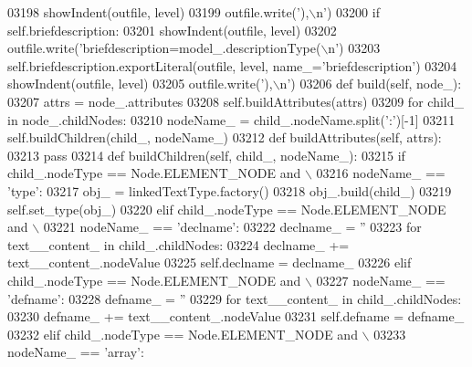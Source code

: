 \begin{DoxyCode}
{{{{{{{{{{{{{{{{{{{{{{{{{{{{{{{{{{{{{{{{{{{{{{{{{{{{{{{{{{{{{{{{{{{{{{{{{{{{{{{{{{{{{{{{{{{{{{{{{{{{{{{{{{{{{{{{{{{{{{{{{{{{{{{{{{{{{{{{{{{{{{{{{{{{{{{{{{{{{{{{{{{{{{{{{{{{{{{{{{{{{{{{{{{{{{{{{{{{{{{{{{{{{{{{{{{{{03198             showIndent(outfile, level)
03199             outfile.write(\textcolor{stringliteral}{'),\(\backslash\)n'})
03200         \textcolor{keywordflow}{if} self.briefdescription:
03201             showIndent(outfile, level)
03202             outfile.write(\textcolor{stringliteral}{'briefdescription=model\_.descriptionType(\(\backslash\)n'})
03203             self.briefdescription.exportLiteral(outfile, level, name\_=\textcolor{stringliteral}{'briefdescription'})
03204             showIndent(outfile, level)
03205             outfile.write(\textcolor{stringliteral}{'),\(\backslash\)n'})
03206     \textcolor{keyword}{def }build(self, node\_):
03207         attrs = node\_.attributes
03208         self.buildAttributes(attrs)
03209         \textcolor{keywordflow}{for} child\_ \textcolor{keywordflow}{in} node\_.childNodes:
03210             nodeName\_ = child\_.nodeName.split(\textcolor{stringliteral}{':'})[-1]
03211             self.buildChildren(child\_, nodeName\_)
03212     \textcolor{keyword}{def }buildAttributes(self, attrs):
03213         \textcolor{keywordflow}{pass}
03214     \textcolor{keyword}{def }buildChildren(self, child\_, nodeName\_):
03215         \textcolor{keywordflow}{if} child\_.nodeType == Node.ELEMENT\_NODE \textcolor{keywordflow}{and} \(\backslash\)
03216             nodeName\_ == \textcolor{stringliteral}{'type'}:
03217             obj\_ = linkedTextType.factory()
03218             obj\_.build(child\_)
03219             self.set\_type(obj\_)
03220         \textcolor{keywordflow}{elif} child\_.nodeType == Node.ELEMENT\_NODE \textcolor{keywordflow}{and} \(\backslash\)
03221             nodeName\_ == \textcolor{stringliteral}{'declname'}:
03222             declname\_ = \textcolor{stringliteral}{''}
03223             \textcolor{keywordflow}{for} text\_\_content\_ \textcolor{keywordflow}{in} child\_.childNodes:
03224                 declname\_ += text\_\_content\_.nodeValue
03225             self.declname = declname\_
03226         \textcolor{keywordflow}{elif} child\_.nodeType == Node.ELEMENT\_NODE \textcolor{keywordflow}{and} \(\backslash\)
03227             nodeName\_ == \textcolor{stringliteral}{'defname'}:
03228             defname\_ = \textcolor{stringliteral}{''}
03229             \textcolor{keywordflow}{for} text\_\_content\_ \textcolor{keywordflow}{in} child\_.childNodes:
03230                 defname\_ += text\_\_content\_.nodeValue
03231             self.defname = defname\_
03232         \textcolor{keywordflow}{elif} child\_.nodeType == Node.ELEMENT\_NODE \textcolor{keywordflow}{and} \(\backslash\)
03233             nodeName\_ == \textcolor{stringliteral}{'array'}:
}}}}}}}}}}}}}}}}}}}}}}}}}}}}}}}}}}}}}}}}}}}}}}}}}}}}}}}}}}}}}}}}}}}}}}}}}}}}}}}}}}}}}}}}}}}}}}}}}}}}}}}}}}}}}}}}}}}}}}}}}}}}}}}}}}}}}}}}}}}}}}}}}}}}}}}}}}}}}}}}}}}}}}}}}}}}}}}}}}}}}}}}}}}}}}}}}}}}}}}}}}}}}}}}}}}}}
\end{DoxyCode}
